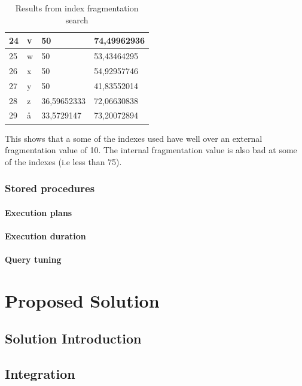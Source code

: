 \documentclass{cslthse-msc}
\begin{document}
\begin{table}[H]
\begin{center}
\begin{tabular}{|l|l|l|l|}
24 & v & 50          & 74,49962936 \\ \hline
25 & w & 50          & 53,43464295 \\ \hline
26 & x & 50          & 54,92957746 \\ \hline
27 & y & 50          & 41,83552014 \\ \hline
28 & z & 36,59652333 & 72,06630838 \\ \hline
29 & å & 33,5729147  & 73,20072894 \\ \hline
\end{tabular}
\caption{Results from index fragmentation search}
\end{center}
\end{table}

This shows that a some of the indexes used have well over an external fragmentation value of 10. The internal fragmentation value is also bad at some of the indexes (i.e less than 75).

\subsection{Stored procedures}

\subsubsection{Execution plans}

\subsubsection{Execution duration}

\subsubsection{Query tuning}

\chapter{Proposed Solution}\label{sec:proposedsoluton}

\section{Solution Introduction}

\section{Integration}
\end{document}
